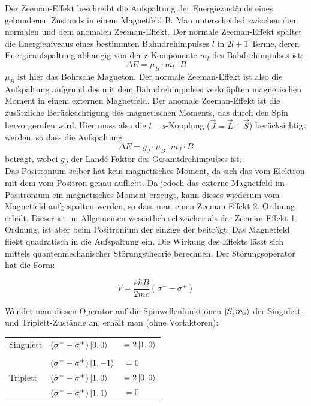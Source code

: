 Der Zeeman-Effekt beschreibt die Aufspaltung der Energiezustände eines gebundenen Zustands in einem Magnetfeld B. Man unterscheided zwischen dem normalen und dem anomalen Zeeman-Effekt. 
Der normale Zeeman-Effekt spaltet die Energieniveaus eines bestimmten Bahndrehimpulses $l$ in $2l+1$ Terme, deren Energieaufspaltung abhängig von der z-Komponente $m_l$ des Bahdrehimpulses ist:
$$\Delta E = \mu_B\cdot m_l \cdot B$$
$\mu_B$ ist hier das Bohrsche Magneton. Der normale Zeeman-Effekt ist also die Aufspaltung aufgrund des mit dem Bahndrehimpulses verknüpften magnetischen Moment in einem externen Magnetfeld.
Der anomale Zeeman-Effekt ist die zusätzliche Berücksichtigung des magnetischen Moments, das durch den Spin hervorgerufen wird. Hier muss also die $l-s$-Kopplung ($\vec J = \vec L + \vec S$) berücksichtigt werden, so dass die Aufspaltung
$$\Delta E = g_J\cdot\mu_B\cdot m_J\cdot B$$
beträgt, wobei $g_J$ der Landé-Faktor des Gesamtdrehimpulses ist.\\

Das Positronium selber hat kein magnetisches Moment, da sich das vom Elektron mit dem vom Positron genau aufhebt. Da jedoch das externe Magnetfeld im Positronium ein magnetisches Moment erzeugt, kann dieses wiederum vom Magnetfeld aufgespalten werden, so dass man einen Zeeman-Effekt 2. Ordnung erhält. Dieser ist im Allgemeinen wesentlich schwächer als der Zeeman-Effekt 1. Ordnung, ist aber beim Positronium der einzige der beiträgt. Das Magnetfeld fließt quadratisch in die Aufspaltung ein. Die Wirkung des Effekts lässt sich mittels quantenmechanischer Störungstheorie berechnen. Der Störungsoperator hat die Form:

\begin{equation} V=\frac{e\hbar B}{2mc}(\sigma^- - \sigma^+) \end{equation} 

Wendet man diesen Operator auf die Spinwellenfunktionen $\ket{S,m_s}$ der Singulett- und Triplett-Zustände an, erhält man (ohne Vorfaktoren):\\

\begin{tabular}[H]{l l l}
Singulett 	& $(\sigma^- - \sigma^+)\ket{0,0}$ &$ = 2\ket{1,0}$\\
& & \\
		& $(\sigma^- - \sigma^+)\ket{1,-1}$ & $ = 0$\\
Triplett 	& $(\sigma^- - \sigma^+)\ket{1,0}$ &$ = 2\ket{0,0}$\\
		& $(\sigma^- - \sigma^+)\ket{1,1}$ &$ = 0$\\
\end{tabular}\\

